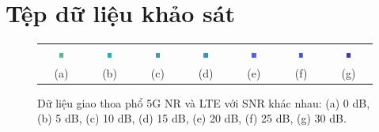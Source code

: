 \section{Tệp dữ liệu khảo sát}
\begin{figure}[!h]
    \centering
    \footnotesize
    \begin{tabular}{ccccccc}
        \includegraphics[width=0.12\textwidth]{fig/LTE_NR_0db.png} & \includegraphics[width=0.12\textwidth]{fig/LTE_NR_5db.png} &
        \includegraphics[width=0.12\textwidth]{fig/LTE_NR_10db.png}&
        \includegraphics[width=0.12\textwidth]{fig/LTE_NR_15db.png}& \includegraphics[width=0.12\textwidth]{fig/LTE_NR_20db.png}&
        \includegraphics[width=0.12\textwidth]{fig/LTE_NR_25db.png}&
        \includegraphics[width=0.12\textwidth]{fig/LTE_NR_30db.png}
        \\
        (a) & (b) & (c) & (d) & (e) & (f) & (g)
    \end{tabular}
    \caption{Dữ liệu giao thoa phổ 5G NR và LTE với SNR khác nhau: (a) 0 dB, (b) 5 dB, (c) 10 dB, (d) 15 dB, (e) 20 dB, (f) 25 dB, (g) 30 dB.}
    \label{fig_dataset5GLTE}
\end{figure}

